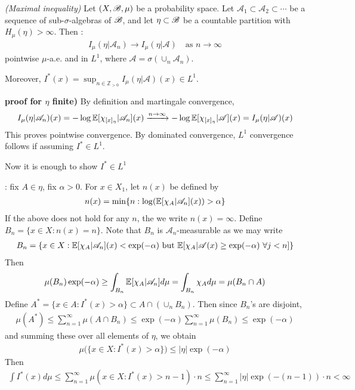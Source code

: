 \documentclass[12pt,a4paper]{report}
\newenvironment{proof}
{\begin{changemargin}{1cm}{0.5cm} 
	}%
	{\end{changemargin}
}
\newenvironment{subproof}
{\begin{changemargin}{0.5cm}{0.5cm}
	}%
	{\end{changemargin}
}
\begin{document}
\thm \emph{(Maximal inequality)} Let $(X,\mathscr{B}, \mu)$ be a probability space. Let $\mathscr{A}_1 \subset \mathscr{A}_2 \subset \cdots$ be a sequence of sub-$\sigma$-algebras of $\mathscr{B}$, and let $\eta \subset \mathscr{B}$ be a countable partition with $H_{\mu}(\eta) >\infty$. Then :
\begin{align*}
I_{\mu}(\eta | \mathscr{A}_n) \rightarrow I_{\mu}(\eta | \mathscr{A}) \quad \text{as } n\rightarrow \infty
\end{align*}
pointwise $\mu$-a.e. and in $L^1$, where $\mathscr{A} = \sigma(\cup_n \mathscr{A}_n)$.

\quad Moreover, $I^*(x) = \sup_{n\in \mathbb{Z}_{>0}}I_{\mu}(\eta | \mathscr{A}) (x) \in L^1$.
\begin{proof}
\textbf{proof for $\eta$ finite)} By definition and martingale convergence,
\begin{align*}
I_{\mu}(\eta | \mathscr{A}_n)(x) = -\log \mathbb{E} [ \chi_{[x]_{\eta}} | \mathscr{A}_n ](x) \xrightarrow{n\rightarrow \infty} -\log \mathbb{E} [ \chi_{[x]_{\eta}} | \mathscr{A}](x) = I_{\mu}(\eta | \mathscr{A})(x)
\end{align*}
This proves pointwise convergence. By dominated convergence, $L^1$ convergence follows if assuming $I^* \in L^1$.

\quad Now it is enough to show $I^* \in L^1$
\begin{subproof}
: fix $A \in \eta$, fix $\alpha>0$. For $x\in X_1$, let $n(x)$ be defined by
\begin{align*}
n(x) = \min \{ n : \log (\mathbb{E}[\chi_A | \mathscr{A}_n](x)) > \alpha \}
\end{align*}
If the above does not hold for any $n$, the we write $n(x) = \infty$. Define $B_n = \{ x\in X : n(x) =n \}$. Note that $B_n$ is $\mathscr{A}_n$-measurable as we may write
\begin{align*}
B_n = \{ x\in X : \mathbb{E}[\chi_A | \mathscr{A}_n](x) < \exp(-\alpha) \text{ but } \mathbb{E}[\chi_A |\mathscr{A}(x) \geq \exp(-\alpha) \,\, \forall j<n ] \}
\end{align*}
Then
\begin{align*}
\mu(B_n) \exp(-\alpha) \geq \int_{B_n} \mathbb{E}[\chi_A | \mathscr{A}_n] d\mu = \int_{B_n} \chi_A d\mu = \mu(B_n \cap A)
\end{align*}
Define $A^* = \{ x\in A : I^*(x) > \alpha \} \subset A \cap (\cup_n B_n)$. Then since $B_n$'s are disjoint,
\begin{align*}
\mu(A^*) \leq \sum_{n=1}^{\infty} \mu(A\cap B_n) \leq \exp(-\alpha) \sum_{n=1}^{\infty} \mu(B_n) \leq \exp(-\alpha)
\end{align*}
and summing these over all elements of $\eta$, we obtain
\begin{align*}
\mu \big( \{ x\in X : I^*(x) > \alpha \} \big) \leq |\eta| \exp(-\alpha)
\end{align*}
Then
\begin{align*}
\int I^*(x) d\mu \leq \sum_{n=1}^{\infty} \mu(x\in X : I^*(x) > n-1) \cdot n \leq \sum_{n=1}^{\infty} |\eta| \exp(-(n-1))\cdot n < \infty
\end{align*}
\end{subproof}

\eop
\end{proof}
\s
\end{document}

